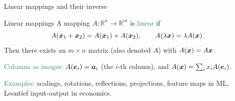 \documentclass{beamer}
\begin{document}
\begin{frame} \begin{center}
	\alert{\Huge Linear mappings and their inverse}
\end{center}\end{frame}



%
%


\begin{frame}{Linear mappings}
A mapping $A:\mathbb{R}^n\to\mathbb{R}^m$ is \textcolor{SeaGreen}{linear} if
\[
A(\boldsymbol x_1+\boldsymbol x_2)=A(\boldsymbol x_1)+A(\boldsymbol x_2),\qquad
A(\lambda \boldsymbol x)=\lambda A(\boldsymbol x).
\]
Then there exists an $m\times n$ matrix (also denoted $A$) with $A(\boldsymbol x)=A\boldsymbol x$.
\bigskip

\textcolor{SeaGreen}{Columns as images:} $A(\boldsymbol e_i)=\boldsymbol a_i$ (the $i$-th column), and $A(\boldsymbol x)=\sum_i x_i A(\boldsymbol e_i)$.
\bigskip

\textcolor{SeaGreen}{Examples:} scalings, rotations, reflections, projections, feature maps in ML, Leontief input-output in economics.
\end{frame}
\end{document}
